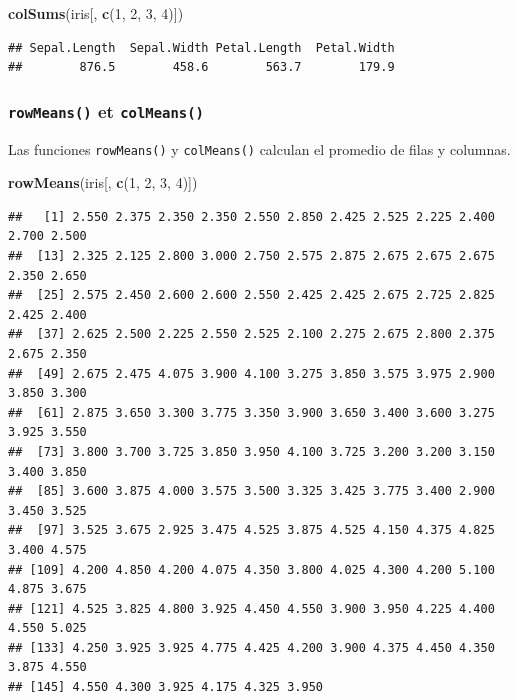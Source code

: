\documentclass[
]{book}
\newenvironment{Shaded}{\begin{snugshade}}{\end{snugshade}}
\newcommand{\DecValTok}[1]{\textcolor[rgb]{0.00,0.00,0.81}{#1}}
\newcommand{\KeywordTok}[1]{\textcolor[rgb]{0.13,0.29,0.53}{\textbf{#1}}}
\newcommand{\NormalTok}[1]{#1}
\begin{document}
\begin{Shaded}
\begin{Highlighting}[]
\KeywordTok{colSums}\NormalTok{(iris[, }\KeywordTok{c}\NormalTok{(}\DecValTok{1}\NormalTok{, }\DecValTok{2}\NormalTok{, }\DecValTok{3}\NormalTok{, }\DecValTok{4}\NormalTok{)])}
\end{Highlighting}
\end{Shaded}

\begin{verbatim}
## Sepal.Length  Sepal.Width Petal.Length  Petal.Width 
##        876.5        458.6        563.7        179.9
\end{verbatim}

\hypertarget{l015rowmeans}{%
\subsubsection{\texorpdfstring{\texttt{rowMeans()} et \texttt{colMeans()}}{rowMeans() et colMeans()}}\label{l015rowmeans}}

Las funciones \texttt{rowMeans()} y \texttt{colMeans()} calculan el promedio de filas y columnas.

\begin{Shaded}
\begin{Highlighting}[]
\KeywordTok{rowMeans}\NormalTok{(iris[, }\KeywordTok{c}\NormalTok{(}\DecValTok{1}\NormalTok{, }\DecValTok{2}\NormalTok{, }\DecValTok{3}\NormalTok{, }\DecValTok{4}\NormalTok{)])}
\end{Highlighting}
\end{Shaded}

\begin{verbatim}
##   [1] 2.550 2.375 2.350 2.350 2.550 2.850 2.425 2.525 2.225 2.400 2.700 2.500
##  [13] 2.325 2.125 2.800 3.000 2.750 2.575 2.875 2.675 2.675 2.675 2.350 2.650
##  [25] 2.575 2.450 2.600 2.600 2.550 2.425 2.425 2.675 2.725 2.825 2.425 2.400
##  [37] 2.625 2.500 2.225 2.550 2.525 2.100 2.275 2.675 2.800 2.375 2.675 2.350
##  [49] 2.675 2.475 4.075 3.900 4.100 3.275 3.850 3.575 3.975 2.900 3.850 3.300
##  [61] 2.875 3.650 3.300 3.775 3.350 3.900 3.650 3.400 3.600 3.275 3.925 3.550
##  [73] 3.800 3.700 3.725 3.850 3.950 4.100 3.725 3.200 3.200 3.150 3.400 3.850
##  [85] 3.600 3.875 4.000 3.575 3.500 3.325 3.425 3.775 3.400 2.900 3.450 3.525
##  [97] 3.525 3.675 2.925 3.475 4.525 3.875 4.525 4.150 4.375 4.825 3.400 4.575
## [109] 4.200 4.850 4.200 4.075 4.350 3.800 4.025 4.300 4.200 5.100 4.875 3.675
## [121] 4.525 3.825 4.800 3.925 4.450 4.550 3.900 3.950 4.225 4.400 4.550 5.025
## [133] 4.250 3.925 3.925 4.775 4.425 4.200 3.900 4.375 4.450 4.350 3.875 4.550
## [145] 4.550 4.300 3.925 4.175 4.325 3.950
\end{verbatim}
\end{document}
